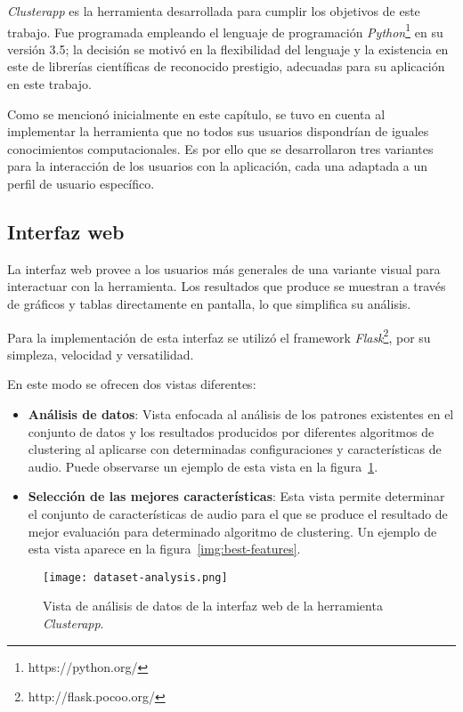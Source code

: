 \textit{Clusterapp} es la herramienta desarrollada para cumplir los objetivos de este trabajo.
Fue programada empleando el lenguaje de programación \textit{Python}\footnote{https://python.org/} en su versión 3.5;
la decisión se motivó en la flexibilidad del lenguaje y la existencia en este de librerías científicas de reconocido prestigio, adecuadas para su aplicación en este trabajo.

Como se mencionó inicialmente en este capítulo, se tuvo en cuenta al implementar la herramienta que no todos sus usuarios dispondrían de iguales conocimientos computacionales.
Es por ello que se desarrollaron tres variantes para la interacción de los usuarios con la aplicación, cada una adaptada a un perfil de usuario específico.

\subsection{Interfaz web}\label{subsec:interfazWeb}

La interfaz web provee a los usuarios más generales de una variante visual para interactuar con la herramienta.
Los resultados que produce se muestran a través de gráficos y tablas directamente en pantalla, lo que simplifica su análisis.

Para la implementación de esta interfaz se utilizó el framework \textit{Flask}\footnote{http://flask.pocoo.org/}, por su simpleza, velocidad y versatilidad.

En este modo se ofrecen dos vistas diferentes:

\begin{itemize}
    \item \textbf{Análisis de datos}: Vista enfocada al análisis de los patrones existentes en el conjunto de datos y los resultados producidos por diferentes algoritmos de clustering al aplicarse con determinadas configuraciones y características de audio. Puede observarse un ejemplo de esta vista en la figura~\ref{img:dataset-analysis}.
    \item \textbf{Selección de las mejores características}: Esta vista permite determinar el conjunto de características de audio para el que se produce el resultado de mejor evaluación para determinado algoritmo de clustering. Un ejemplo de esta vista aparece en la figura~\ref{img:best-features}.
\end{itemize}

\begin{figure}[!h]
    \centering
    \texttt{[image: dataset-analysis.png]}
    \caption{Vista de análisis de datos de la interfaz web de la herramienta \textit{Clusterapp}.}
    \label{img:dataset-analysis}
\end{figure}

